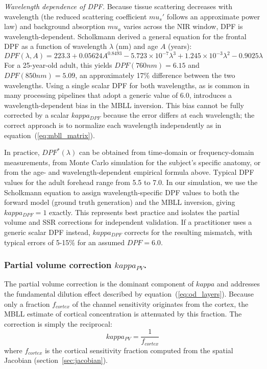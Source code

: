 \documentclass[11pt]{article}
\def\kappa{kappa}%
\def\mu{mu}%
\def\mathrm#1{#1}%
\def\,{ }%
\begin{document}
\textit{Wavelength dependence of DPF.} Because tissue scattering decreases with wavelength (the reduced scattering coefficient $\mu_s'$ follows an approximate power law) and background absorption $\mu_a$ varies across the NIR window, DPF is wavelength-dependent. Scholkmann\cite{r14} derived a general equation for the frontal DPF as a function of wavelength $\lambda$ (nm) and age $A$ (years):
\begin{equation}
\mathrm{DPF}(\lambda, A) = 223.3 + 0.05624\,A^{0.8493} - 5.723 \times 10^{-7}\,\lambda^3 + 1.245 \times 10^{-3}\,\lambda^2 - 0.9025\,\lambda
\label{eq:scholkmann_dpf}
\end{equation}
For a 25-year-old adult, this yields $\mathrm{DPF}(760\,\mathrm{nm}) = 6.15$ and $\mathrm{DPF}(850\,\mathrm{nm}) = 5.09$, an approximately 17\% difference between the two wavelengths. Using a single scalar DPF for both wavelengths, as is common in many processing pipelines that adopt a generic value of 6.0, introduces a wavelength-dependent bias in the MBLL inversion. This bias cannot be fully corrected by a scalar $\kappa_{\mathrm{DPF}}$ because the error differs at each wavelength; the correct approach is to normalize each wavelength independently as in equation~(\ref{eq:mbll_matrix}).

In practice, $\mathrm{DPF}^{*}(\lambda)$ can be obtained from time-domain or frequency-domain measurements\cite{r22}, from Monte Carlo simulation for the subject's specific anatomy\cite{r20}, or from the age- and wavelength-dependent empirical formula above\cite{r14}. Typical DPF values for the adult forehead range from 5.5 to 7.0. In our simulation, we use the Scholkmann equation to assign wavelength-specific DPF values to both the forward model (ground truth generation) and the MBLL inversion, giving $\kappa_{\mathrm{DPF}} = 1$ exactly. This represents best practice and isolates the partial volume and SSR corrections for independent validation. If a practitioner uses a generic scalar DPF instead, $\kappa_{\mathrm{DPF}}$ corrects for the resulting mismatch, with typical errors of 5-15\% for an assumed $\mathrm{DPF} = 6.0$.

\subsubsection{Partial volume correction \texorpdfstring{$\kappa_{\mathrm{PV}}$}{kappa\_PV}.}

The partial volume correction is the dominant component of $\kappa$ and addresses the fundamental dilution effect described by equation~(\ref{eq:od_layers}). Because only a fraction $f_{\mathrm{cortex}}$ of the channel sensitivity originates from the cortex, the MBLL estimate of cortical concentration is attenuated by this fraction. The correction is simply the reciprocal:
\begin{equation}
\kappa_{\mathrm{PV}} = \frac{1}{f_{\mathrm{cortex}}}
\label{eq:kappa_pv}
\end{equation}
where $f_{\mathrm{cortex}}$ is the cortical sensitivity fraction computed from the spatial Jacobian (section~\ref{sec:jacobian}).
\end{document}
